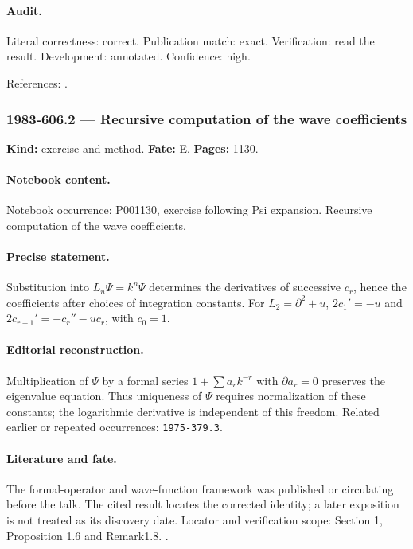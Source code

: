 \paragraph{Audit.} Literal correctness: correct. Publication match: exact. Verification: read the result. Development: annotated. Confidence: high.

\noindent References: \citep{cherednik1978differential}.\par

\subsubsection{1983-606.2 --- Recursive computation of the wave coefficients}

\label{item:1983-606.2}

\noindent\textbf{Kind:} exercise and method. \textbf{Fate:} E. \textbf{Pages:} 1130.\par

\paragraph{Notebook content.} Notebook occurrence: P001130, exercise following Psi expansion. Recursive computation of the wave coefficients.

\paragraph{Precise statement.} Substitution into \(L_n\Psi=k^n\Psi\) determines the derivatives of successive \(c_r\), hence the coefficients after choices of integration constants. For \(L_2=\partial^2+u\), \(2c_1'=-u\) and \(2c_{r+1}'=-c_r''-uc_r\), with \(c_0=1\).

\paragraph{Editorial reconstruction.} Multiplication of \(\Psi\) by a formal series \(1+\sum a_rk^{-r}\) with \(\partial a_r=0\) preserves the eigenvalue equation. Thus uniqueness of \(\Psi\) requires normalization of these constants; the logarithmic derivative is independent of this freedom. Related earlier or repeated occurrences: \texttt{1975-379.3}.

\paragraph{Literature and fate.} The formal-operator and wave-function framework was published or circulating before the talk. The cited result locates the corrected identity; a later exposition is not treated as its discovery date. Locator and verification scope: Section 1, Proposition 1.6 and Remark1.8. \cite{cherednik1978differential}.

